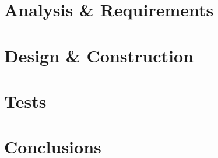 %
\part{Analysis \& Requirements}\label{pt:analysis} \glsresetall
 
\part{Design \& Construction}\label{pt:design} 
 
%
\part{Tests}\label{pt:tests} 
\part{Conclusions}\label{pt:conclusions} 
%

